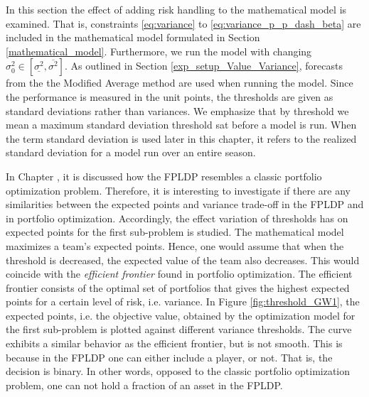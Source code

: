 In this section the effect of adding risk handling to the mathematical model is examined. That is, constraints \ref{eq:variance} to \ref{eq:variance_p_p_dash_beta} are included in the mathematical model formulated in Section \ref{mathematical_model}. Furthermore, we run the model with changing $\sigma_{0}^2 \in [\underline{\sigma^2}, \overline{\sigma^2}]$. As outlined in Section \ref{exp_setup_Value_Variance}, forecasts from the the Modified Average method are used when running the model. Since the performance is measured in the unit points, the thresholds are given as standard deviations rather than variances. We emphasize that by threshold we mean a maximum standard deviation threshold sat before a model is run. When the term standard deviation is used later in this chapter, it refers to the realized standard deviation for a model run over an entire season. 

\newpar

\newpar

In Chapter , it is discussed how the FPLDP resembles a classic portfolio optimization problem. Therefore, it is interesting to investigate if there are any similarities between the expected points and variance trade-off in the FPLDP and in portfolio optimization. Accordingly, the effect variation of thresholds has on expected points for the first sub-problem is studied. The mathematical model maximizes a team's expected points. Hence, one would assume that when the threshold is decreased, the expected value of the team also decreases. This would coincide with the \textit{efficient frontier} found in portfolio optimization. The efficient frontier consists of the optimal set of portfolios that gives the highest expected points for a certain level of risk, i.e. variance. In Figure \ref{fig:threshold_GW1}, the expected points, i.e. the objective value, obtained by the optimization model for the first sub-problem is plotted against different variance thresholds. The curve exhibits a similar behavior as the efficient frontier, but is not smooth. This is because in the FPLDP one can either include a player, or not. That is, the decision is binary. In other words, opposed to the classic portfolio optimization problem, one can not hold a fraction of an asset in the FPLDP. 
\newpar

